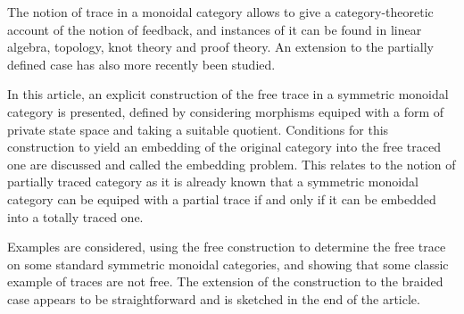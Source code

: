 The notion of trace in a monoidal category allows
to give a category-theoretic account of the notion of feedback, and instances of
it can be found in linear algebra, topology, knot theory and proof theory. An extension to the 
partially defined case has also more recently been studied.

In this article, an explicit construction of the free trace in a symmetric monoidal category is presented,
defined by considering morphisms equiped with a form of private state space and taking a 
suitable quotient.
Conditions for this construction to yield an embedding of the original category into the free traced
one are discussed and called the embedding problem. 
This relates to the notion of partially traced category as it is already known that a symmetric
monoidal category can be equiped with a partial trace if and only if it can be embedded into a
totally traced one.

Examples are considered, using the free construction to determine the free trace on
some standard symmetric monoidal categories, and showing that some classic example of traces are not free.
The extension of the construction to the braided case appears to be straightforward and is sketched in
the end of the article.
